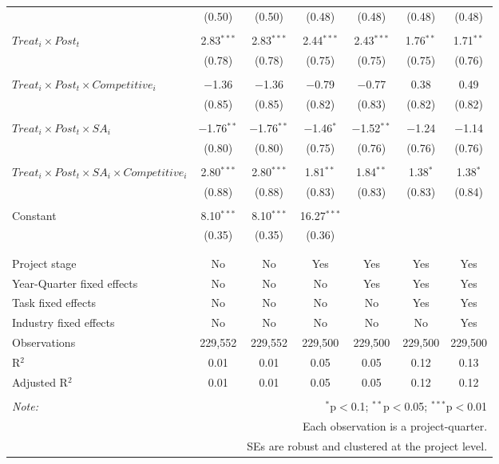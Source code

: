 \documentclass[
]{article}
\begin{document}
\begin{table}[H]
\begin{tabular}{@{\extracolsep{-3pt}}lcccccc}
  & (0.50) & (0.50) & (0.48) & (0.48) & (0.48) & (0.48) \\ 
  & & & & & & \\ 
 $Treat_i \times Post_t$ & 2.83$^{***}$ & 2.83$^{***}$ & 2.44$^{***}$ & 2.43$^{***}$ & 1.76$^{**}$ & 1.71$^{**}$ \\ 
  & (0.78) & (0.78) & (0.75) & (0.75) & (0.75) & (0.76) \\ 
  & & & & & & \\ 
 $Treat_i \times Post_t \times Competitive_i$ & $-$1.36 & $-$1.36 & $-$0.79 & $-$0.77 & 0.38 & 0.49 \\ 
  & (0.85) & (0.85) & (0.82) & (0.83) & (0.82) & (0.82) \\ 
  & & & & & & \\ 
 $Treat_i \times Post_t \times SA_i$ & $-$1.76$^{**}$ & $-$1.76$^{**}$ & $-$1.46$^{*}$ & $-$1.52$^{**}$ & $-$1.24 & $-$1.14 \\ 
  & (0.80) & (0.80) & (0.75) & (0.76) & (0.76) & (0.76) \\ 
  & & & & & & \\ 
 $Treat_i \times Post_t \times SA_i \times Competitive_i$ & 2.80$^{***}$ & 2.80$^{***}$ & 1.81$^{**}$ & 1.84$^{**}$ & 1.38$^{*}$ & 1.38$^{*}$ \\ 
  & (0.88) & (0.88) & (0.83) & (0.83) & (0.83) & (0.84) \\ 
  & & & & & & \\ 
 Constant & 8.10$^{***}$ & 8.10$^{***}$ & 16.27$^{***}$ &  &  &  \\ 
  & (0.35) & (0.35) & (0.36) &  &  &  \\ 
  & & & & & & \\ 
\hline \\[-1.8ex] 
Project stage & No & No & Yes & Yes & Yes & Yes \\ 
Year-Quarter fixed effects & No & No & No & Yes & Yes & Yes \\ 
Task fixed effects & No & No & No & No & Yes & Yes \\ 
Industry fixed effects & No & No & No & No & No & Yes \\ 
Observations & 229,552 & 229,552 & 229,500 & 229,500 & 229,500 & 229,500 \\ 
R$^{2}$ & 0.01 & 0.01 & 0.05 & 0.05 & 0.12 & 0.13 \\ 
Adjusted R$^{2}$ & 0.01 & 0.01 & 0.05 & 0.05 & 0.12 & 0.12 \\ 
\hline 
\hline \\[-1.8ex] 
\textit{Note:}  & \multicolumn{6}{r}{$^{*}$p$<$0.1; $^{**}$p$<$0.05; $^{***}$p$<$0.01} \\ 
 & \multicolumn{6}{r}{Each observation is a project-quarter.} \\ 
 & \multicolumn{6}{r}{SEs are robust and clustered at the project level.} \\ 
\end{tabular} 
\end{table}
\end{document}
